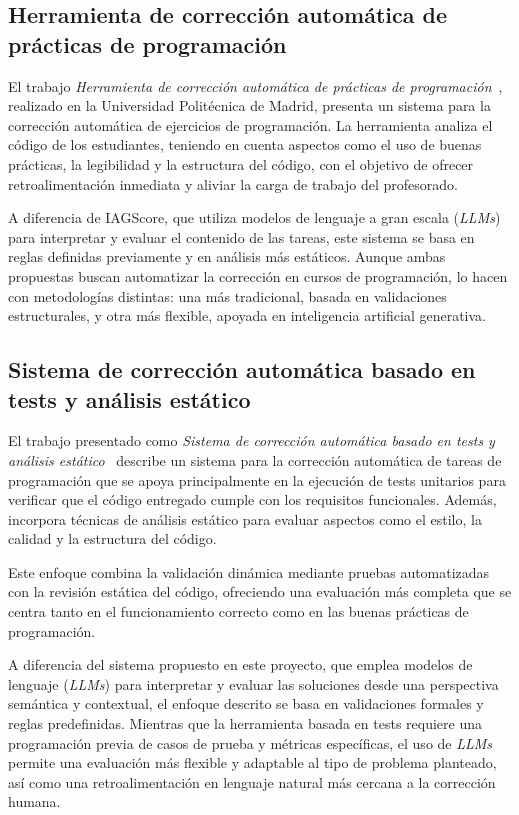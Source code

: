 
\subsection{Herramienta de corrección automática de prácticas de programación}

El trabajo \textit{Herramienta de corrección automática de prácticas de programación}~\cite{tfg:alvarez2024}, realizado en la Universidad Politécnica de Madrid, presenta un sistema para la corrección automática de ejercicios de programación. La herramienta analiza el código de los estudiantes, teniendo en cuenta aspectos como el uso de buenas prácticas, la legibilidad y la estructura del código, con el objetivo de ofrecer retroalimentación inmediata y aliviar la carga de trabajo del profesorado.

A diferencia de IAGScore, que utiliza modelos de lenguaje a gran escala (\textit{LLMs}) para interpretar y evaluar el contenido de las tareas, este sistema se basa en reglas definidas previamente y en análisis más estáticos. Aunque ambas propuestas buscan automatizar la corrección en cursos de programación, lo hacen con metodologías distintas: una más tradicional, basada en validaciones estructurales, y otra más flexible, apoyada en inteligencia artificial generativa.

\subsection{Sistema de corrección automática basado en tests y análisis estático}

El trabajo presentado como \textit{Sistema de corrección automática basado en tests y análisis estático}~\cite{montanes2014} describe un sistema para la corrección automática de tareas de programación que se apoya principalmente en la ejecución de tests unitarios para verificar que el código entregado cumple con los requisitos funcionales. Además, incorpora técnicas de análisis estático para evaluar aspectos como el estilo, la calidad y la estructura del código.

Este enfoque combina la validación dinámica mediante pruebas automatizadas con la revisión estática del código, ofreciendo una evaluación más completa que se centra tanto en el funcionamiento correcto como en las buenas prácticas de programación. 

A diferencia del sistema propuesto en este proyecto, que emplea modelos de lenguaje (\textit{LLMs}) para interpretar y evaluar las soluciones desde una perspectiva semántica y contextual, el enfoque descrito se basa en validaciones formales y reglas predefinidas. Mientras que la herramienta basada en tests requiere una programación previa de casos de prueba y métricas específicas, el uso de \textit{LLMs} permite una evaluación más flexible y adaptable al tipo de problema planteado, así como una retroalimentación en lenguaje natural más cercana a la corrección humana.

